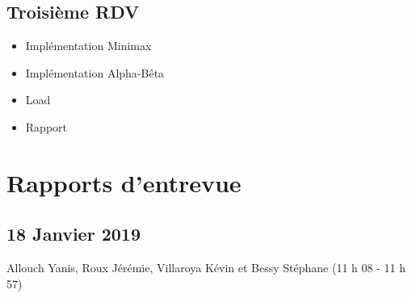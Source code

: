 \documentclass[11pt,a4paper]{article}
\begin{document}
\subsection{Troisième RDV}

\begin{itemize}
    \item Implémentation Minimax
    \item Implémentation Alpha-Bêta
    \item Load
    \item Rapport
\end{itemize}

\newpage
\section{Rapports d'entrevue}

\subsection{18 Janvier 2019}
Allouch Yanis, Roux Jérémie, Villaroya Kévin et Bessy Stéphane (11 h 08 - 11 h 57)\\
\end{document}
